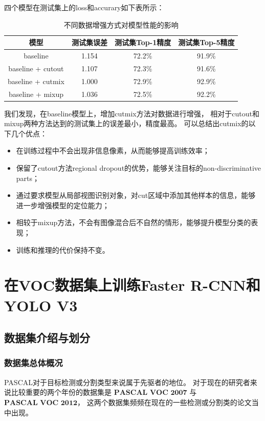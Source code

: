\documentclass[UTF8]{ctexart}
\begin{document}
四个模型在测试集上的loss和accurary如下表所示：

\begin{table}[!ht]
    \begin{center}
        \begin{tabular}{cccc}
            \hline
            模型  & 测试集误差 & 测试集Top-1精度 & 测试集Top-5精度 \\ \hline
            baseline & 1.154 & 72.2\% & 91.9\% \\ \hline
            baseline + cutout & 1.107 & 72.3\% & 91.6\% \\ \hline
            baseline + cutmix & 1.000 & 72.9\% & 92.9\% \\ \hline
            baseline + mixup & 1.036 & 72.5\% & 92.2\% \\ \hline
            \end{tabular}
        \caption{不同数据增强方式对模型性能的影响}
    \end{center}
\end{table}

我们发现，在baseline模型上，增加cutmix方法对数据进行增强，
相对于cutout和mixup两种方法达到的测试集上的误差最小，精度最高。
可以总结出cutmix的以下几个优点：
\begin{itemize}
    \item 在训练过程中不会出现非信息像素，从而能够提高训练效率；
    \item 保留了cutout方法regional dropout的优势，能够关注目标的non-discriminative parts；
    \item 通过要求模型从局部视图识别对象，对cut区域中添加其他样本的信息，能够进一步增强模型的定位能力；
    \item 相较于mixup方法，不会有图像混合后不自然的情形，能够提升模型分类的表现；
    \item 训练和推理的代价保持不变。
\end{itemize}

\newpage

\section{在VOC数据集上训练Faster R-CNN和YOLO V3}

\subsection{数据集介绍与划分}

\subsubsection{数据集总体概况}
PASCAL对于目标检测或分割类型来说属于先驱者的地位。
对于现在的研究者来说比较重要的两个年份的数据集是 $\textbf{PASCAL VOC 2007}$ 
与 $\textbf{PASCAL VOC 2012}$，
这两个数据集频频在现在的一些检测或分割类的论文当中出现。
\end{document}
